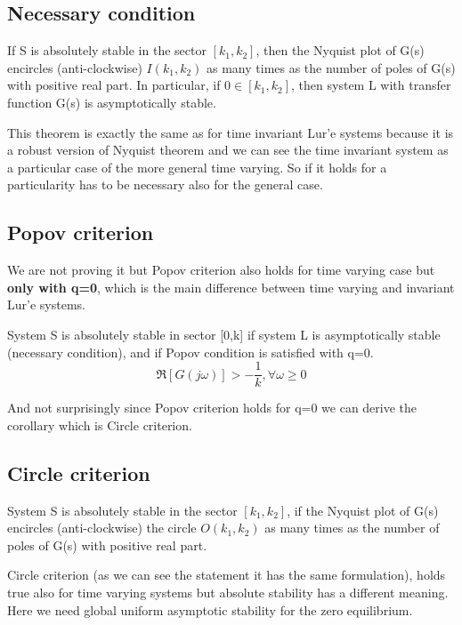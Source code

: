 \subsection{Necessary condition}
\begin{thm}
	If S is absolutely stable in the sector $[k_1, k_2]$, then the Nyquist plot of G(s) encircles (anti-clockwise) $I(k_1,k_2)$ as many times as the number of poles of G(s) with positive real part.
	In particular, if $0\in[k_1, k_2]$, then system L with transfer function G(s) is asymptotically stable.
\end{thm}
\begin{note}
	This theorem is exactly the same as for time invariant Lur'e systems because it is a robust version of Nyquist theorem and we can see the time invariant system as a particular case of the more general time varying. So if it holds for a particularity has to be necessary also for the general case.
\end{note}
\subsection{Popov criterion}
We are not proving it but Popov criterion also holds for time varying case but \textbf{only with q=0}, which is the main difference between time varying and invariant Lur'e systems.
\begin{thm} 
	System S is absolutely stable in sector [0,k] if system L is asymptotically stable (necessary condition), and if Popov condition is satisfied with q=0.
	\[
	\Re\left[G(j\omega)\right] > -\frac{1}{k}, \forall \omega \ge 0
	\]
\end{thm} And not surprisingly since Popov criterion holds for q=0 we can derive the corollary which is Circle criterion.
\subsection{Circle criterion}
\begin{thm}
	System S is absolutely stable in the sector $[k_1,k_2]$, if the Nyquist plot of G(s) encircles (anti-clockwise) the circle $O(k_1, k_2)$ as many times as the number of poles of G(s) with positive real part.
\end{thm}
Circle criterion (as we can see the statement it has the same formulation), holds true also for time varying systems but absolute stability has a different meaning. Here we need global uniform asymptotic stability for the zero equilibrium. 
